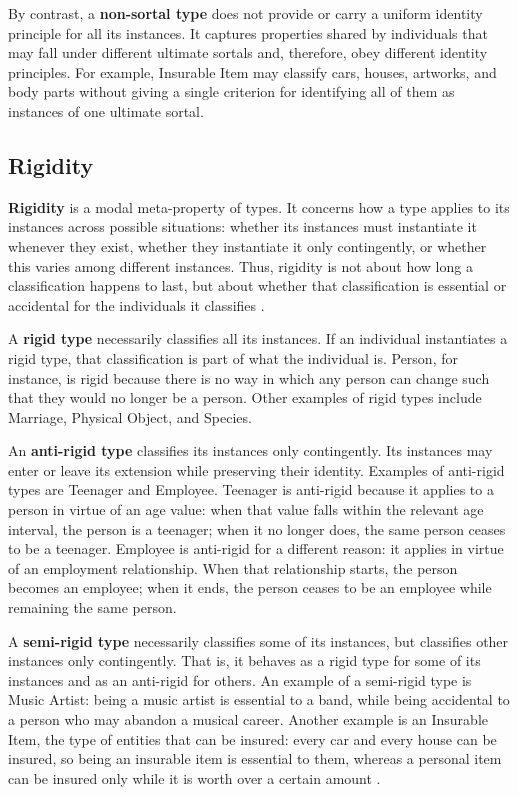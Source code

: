 By contrast, a \textbf{non-sortal type} does not provide or carry a uniform identity principle for all its instances. It captures properties shared by individuals that may fall under different ultimate sortals and, therefore, obey different identity principles. For example, Insurable Item may classify cars, houses, artworks, and body parts without giving a single criterion for identifying all of them as instances of one ultimate sortal.

\subsection{Rigidity}
\label{sec:rigidity}

\textbf{Rigidity} is a modal meta-property of types. It concerns how a type applies to its instances across possible situations: whether its instances must instantiate it whenever they exist, whether they instantiate it only contingently, or whether this varies among different instances. Thus, rigidity is not about how long a classification happens to last, but about whether that classification is essential or accidental for the individuals it classifies \cite{types_and_taxonomic_structures_in_conceptual_modeling_2021}.

A \textbf{rigid type} necessarily classifies all its instances. If an individual instantiates a rigid type, that classification is part of what the individual is. Person, for instance, is rigid because there is no way in which any person can change such that they would no longer be a person. Other examples of rigid types include Marriage, Physical Object, and Species.

An \textbf{anti-rigid type} classifies its instances only contingently. Its instances may enter or leave its extension while preserving their identity. Examples of anti-rigid types are Teenager and Employee. Teenager is anti-rigid because it applies to a person in virtue of an age value: when that value falls within the relevant age interval, the person is a teenager; when it no longer does, the same person ceases to be a teenager. Employee is anti-rigid for a different reason: it applies in virtue of an employment relationship. When that relationship starts, the person becomes an employee; when it ends, the person ceases to be an employee while remaining the same person.

A \textbf{semi-rigid type} necessarily classifies some of its instances, but classifies other instances only contingently. That is, it behaves as a rigid type for some of its instances and as an anti-rigid for others. An example of a semi-rigid type is Music Artist: being a music artist is essential to a band, while being accidental to a person who may abandon a musical career. Another example is an Insurable Item, the type of entities that can be insured: every car and every house can be insured, so being an insurable item is essential to them, whereas a personal item can be insured only while it is worth over a certain amount \cite{types_and_taxonomic_structures_in_conceptual_modeling_2021}.

